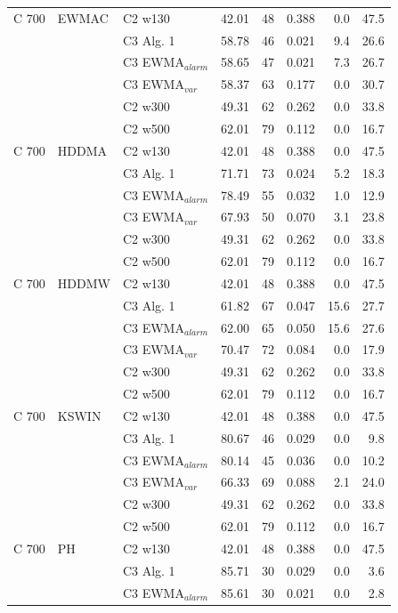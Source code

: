 \begin{longtable}{lllrrrrr}
\hline
C  700 & EWMAC & C2 w130 & 42.01 & 48 & 0.388 & 0.0 & 47.5 \\
 &  & C3 Alg. 1 & 58.78 & 46 & 0.021 & 9.4 & 26.6 \\
 &  & C3 EWMA$_{alarm}$ & 58.65 & 47 & 0.021 & 7.3 & 26.7 \\
 &  & C3 EWMA$_{var}$ & 58.37 & 63 & 0.177 & 0.0 & 30.7 \\
 &  & C2 w300 & 49.31 & 62 & 0.262 & 0.0 & 33.8 \\
 &  & C2 w500 & 62.01 & 79 & 0.112 & 0.0 & 16.7 \\
\hline
C  700 & HDDMA & C2 w130 & 42.01 & 48 & 0.388 & 0.0 & 47.5 \\
 &  & C3 Alg. 1 & 71.71 & 73 & 0.024 & 5.2 & 18.3 \\
 &  & C3 EWMA$_{alarm}$ & 78.49 & 55 & 0.032 & 1.0 & 12.9 \\
 &  & C3 EWMA$_{var}$ & 67.93 & 50 & 0.070 & 3.1 & 23.8 \\
 &  & C2 w300 & 49.31 & 62 & 0.262 & 0.0 & 33.8 \\
 &  & C2 w500 & 62.01 & 79 & 0.112 & 0.0 & 16.7 \\
\hline
C  700 & HDDMW & C2 w130 & 42.01 & 48 & 0.388 & 0.0 & 47.5 \\
 &  & C3 Alg. 1 & 61.82 & 67 & 0.047 & 15.6 & 27.7 \\
 &  & C3 EWMA$_{alarm}$ & 62.00 & 65 & 0.050 & 15.6 & 27.6 \\
 &  & C3 EWMA$_{var}$ & 70.47 & 72 & 0.084 & 0.0 & 17.9 \\
 &  & C2 w300 & 49.31 & 62 & 0.262 & 0.0 & 33.8 \\
 &  & C2 w500 & 62.01 & 79 & 0.112 & 0.0 & 16.7 \\
\hline
C  700 & KSWIN & C2 w130 & 42.01 & 48 & 0.388 & 0.0 & 47.5 \\
 &  & C3 Alg. 1 & 80.67 & 46 & 0.029 & 0.0 & 9.8 \\
 &  & C3 EWMA$_{alarm}$ & 80.14 & 45 & 0.036 & 0.0 & 10.2 \\
 &  & C3 EWMA$_{var}$ & 66.33 & 69 & 0.088 & 2.1 & 24.0 \\
 &  & C2 w300 & 49.31 & 62 & 0.262 & 0.0 & 33.8 \\
 &  & C2 w500 & 62.01 & 79 & 0.112 & 0.0 & 16.7 \\
\hline
C  700 & PH & C2 w130 & 42.01 & 48 & 0.388 & 0.0 & 47.5 \\
 &  & C3 Alg. 1 & 85.71 & 30 & 0.029 & 0.0 & 3.6 \\
 &  & C3 EWMA$_{alarm}$ & 85.61 & 30 & 0.021 & 0.0 & 2.8 \\

\end{longtable}
